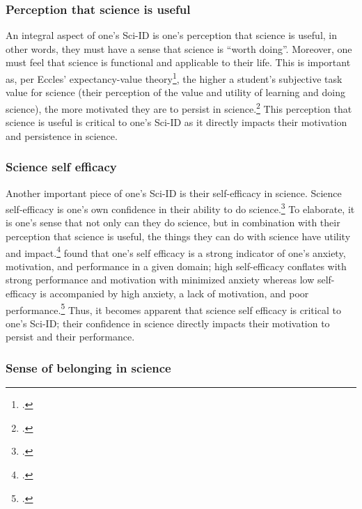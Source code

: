 \documentclass[10pt, twocolumn]{article}
\begin{document}
        \subsubsection{Perception that science is useful}

            An integral aspect of one's Sci-ID is one's perception that science is useful, in other words, they must have a sense that science is ``worth doing''. Moreover, one must feel that science is functional and applicable to their life. This is important as, per Eccles' expectancy-value theory\footcite{wigfield_expectancyvalue_2000}, the higher a student's subjective task value for science (their perception of the value and utility of learning and doing science), the more motivated they are to persist in science.\footcite{brousseau_position_2019} This perception that science is useful is critical to one's Sci-ID as it directly impacts their motivation and persistence in science.

        \subsubsection{Science self efficacy}

            Another important piece of one's Sci-ID is their self-efficacy in science. Science self-efficacy is one's own confidence in their ability to do science.\footcite{ballen_enhancing_2017} To elaborate, it is one's sense that not only can they do science, but in combination with their perception that science is useful, the things they can do with science have utility and impact.\footcite{brousseau_position_2019}  \cite{bandura_perceived_1993} found that one's self efficacy is a strong indicator of one's anxiety, motivation, and performance in a given domain; high self-efficacy conflates with strong performance and motivation with minimized anxiety whereas low self-efficacy is accompanied by high anxiety, a lack of motivation, and poor performance.\footcite{bandura_perceived_1993} Thus, it becomes apparent that science self efficacy is critical to one's Sci-ID; their confidence in science directly impacts their motivation to persist and their performance.

        \subsubsection{Sense of belonging in science}
\end{document}
